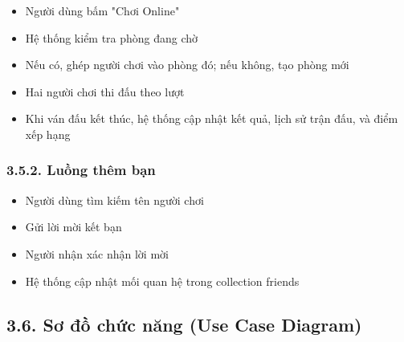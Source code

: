 \documentclass[a4paper,12pt]{article}
\begin{document}
\begin{itemize}[label=·]
    \item Người dùng bấm "Chơi Online"
    \item Hệ thống kiểm tra phòng đang chờ
    \item Nếu có, ghép người chơi vào phòng đó; nếu không, tạo phòng mới
    \item Hai người chơi thi đấu theo lượt
    \item Khi ván đấu kết thúc, hệ thống cập nhật kết quả, lịch sử trận đấu, và điểm xếp hạng
\end{itemize}

\subsubsection*{3.5.2. Luồng thêm bạn} %

\begin{itemize}[label=·]
    \item Người dùng tìm kiếm tên người chơi
    \item Gửi lời mời kết bạn
    \item Người nhận xác nhận lời mời
    \item Hệ thống cập nhật mối quan hệ trong collection friends
\end{itemize}

\subsection*{3.6. Sơ đồ chức năng (Use Case Diagram)} %
\end{document}
